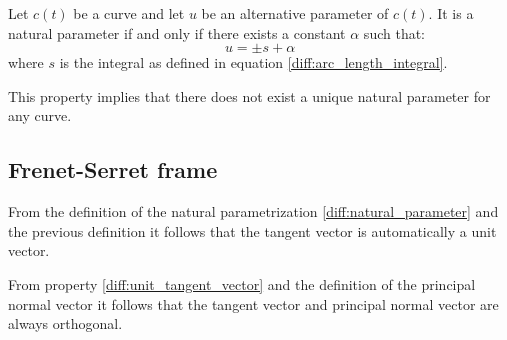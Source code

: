     \begin{property}
        Let $c(t)$ be a curve and let $u$ be an alternative parameter of $c(t)$. It is a natural parameter if and only if there exists a constant $\alpha$ such that:\[u = \pm s + \alpha\] where $s$ is the integral as defined in equation \ref{diff:arc_length_integral}.
    \end{property}
    \begin{remark*}
        This property implies that there does not exist a unique natural parameter for any curve.
    \end{remark*}

\subsection{Frenet-Serret frame}

    \begin{property}\label{diff:unit_tangent_vector}
        From the definition of the natural parametrization \ref{diff:natural_parameter} and the previous definition it follows that the tangent vector is automatically a unit vector.
    \end{property}

    \begin{property}
        From property \ref{diff:unit_tangent_vector} and the definition of the principal normal vector it follows that the tangent vector and principal normal vector are always orthogonal.
    \end{property}


